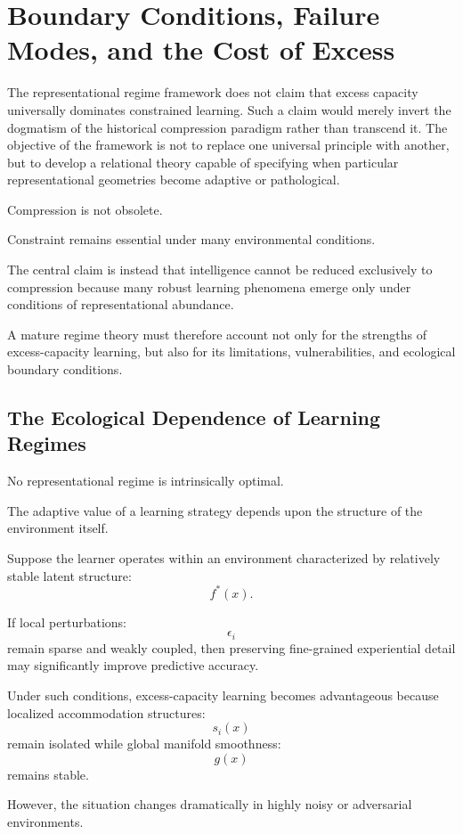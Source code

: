 \documentclass[12pt,a4paper]{article}
\begin{document}
\section{Boundary Conditions, Failure Modes, and the Cost of Excess}

The representational regime framework does not claim that excess capacity universally dominates constrained learning. Such a claim would merely invert the dogmatism of the historical compression paradigm rather than transcend it. The objective of the framework is not to replace one universal principle with another, but to develop a relational theory capable of specifying when particular representational geometries become adaptive or pathological.

Compression is not obsolete.

Constraint remains essential under many environmental conditions.

The central claim is instead that intelligence cannot be reduced exclusively to compression because many robust learning phenomena emerge only under conditions of representational abundance.

A mature regime theory must therefore account not only for the strengths of excess-capacity learning, but also for its limitations, vulnerabilities, and ecological boundary conditions.

\subsection{The Ecological Dependence of Learning Regimes}

No representational regime is intrinsically optimal.

The adaptive value of a learning strategy depends upon the structure of the environment itself.

Suppose the learner operates within an environment characterized by relatively stable latent structure:
\[
f^\ast(x).
\]

If local perturbations:
\[
\epsilon_i
\]
remain sparse and weakly coupled, then preserving fine-grained experiential detail may significantly improve predictive accuracy.

Under such conditions, excess-capacity learning becomes advantageous because localized accommodation structures:
\[
s_i(x)
\]
remain isolated while global manifold smoothness:
\[
g(x)
\]
remains stable.

However, the situation changes dramatically in highly noisy or adversarial environments.
\end{document}
